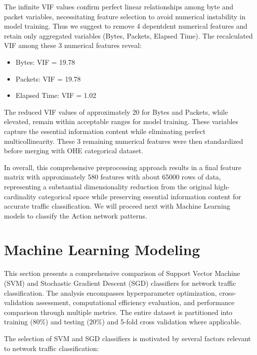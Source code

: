 \documentclass[12pt,a4paper]{article}
\begin{document}
The infinite VIF values confirm perfect linear relationships among byte and packet variables, necessitating feature selection to avoid numerical instability in model training.
Thus we suggest to remove 4 depentdent numerical features and retain only aggregated variables (Bytes, Packets, Elapsed Time). The recalculated VIF among these 3 numerical features reveal:
\begin{itemize}
    \item Bytes: VIF = 19.78
    \item Packets: VIF = 19.78
    \item Elapsed Time: VIF = 1.02
\end{itemize}

The reduced VIF values of approximately 20 for Bytes and Packets, while elevated, remain within acceptable ranges for model training. These variables capture the essential information content while eliminating perfect multicollinearity.
These 3 remaining numerical features were then standardized before merging with OHE categorical dataset.

In overall, this comprehensive preprocessing approach results in a final feature matrix with approximately 580 features with about 65000 rows of data, representing a substantial dimensionality reduction from the original high-cardinality categorical space while preserving essential information content for accurate traffic classification.
We will proceed next with Machine Learning models to classify the Action network patterns.

\section{Machine Learning Modeling}

This section presents a comprehensive comparison of Support Vector Machine (SVM) and Stochastic Gradient Descent (SGD) classifiers for network traffic classification. The analysis encompasses hyperparameter optimization, cross-validation assessment, computational efficiency evaluation, and performance comparison through multiple metrics.
The entire dataset is partitioned into training ($80\%$) and testing ($20\%$) and 5-fold cross validation where applicable.

The selection of SVM and SGD classifiers is motivated by several factors relevant to network traffic classification:
\end{document}
